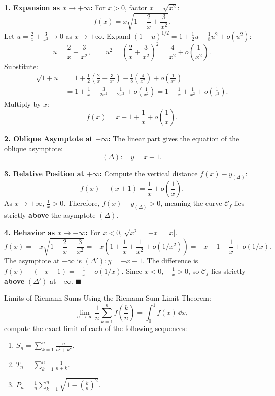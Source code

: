 \begin{solution}
\textbf{1. Expansion as $x \to +\infty$:}
For $x > 0$, factor $x = \sqrt{x^2}$:
\[
f(x) = x \sqrt{1 + \frac{2}{x} + \frac{3}{x^2}}.
\]
Let $u = \frac{2}{x} + \frac{3}{x^2} \to 0$ as $x \to +\infty$.
Expand $(1 + u)^{1/2} = 1 + \frac{1}{2}u - \frac{1}{8}u^2 + o(u^2)$:
\[
u = \frac{2}{x} + \frac{3}{x^2}, \qquad u^2 = \left(\frac{2}{x} + \frac{3}{x^2}\right)^2 = \frac{4}{x^2} + o\left(\frac{1}{x^2}\right).
\]
Substitute:
\begin{align*}
\sqrt{1 + u} &= 1 + \frac{1}{2}\left(\frac{2}{x} + \frac{3}{x^2}\right) - \frac{1}{8}\left(\frac{4}{x^2}\right) + o\left(\frac{1}{x^2}\right) \\
&= 1 + \frac{1}{x} + \frac{3}{2x^2} - \frac{1}{2x^2} + o\left(\frac{1}{x^2}\right) = 1 + \frac{1}{x} + \frac{1}{x^2} + o\left(\frac{1}{x^2}\right).
\end{align*}
Multiply by $x$:
\[
f(x) = x + 1 + \frac{1}{x} + o\left(\frac{1}{x}\right).
\]

\textbf{2. Oblique Asymptote at $+\infty$:}
The linear part gives the equation of the oblique asymptote:
\[
(\Delta): \quad y = x + 1.
\]

\textbf{3. Relative Position at $+\infty$:}
Compute the vertical distance $f(x) - y_{(\Delta)}$:
\[
f(x) - (x + 1) = \frac{1}{x} + o\left(\frac{1}{x}\right).
\]
As $x \to +\infty$, $\frac{1}{x} > 0$.
Therefore, $f(x) - y_{(\Delta)} > 0$, meaning the curve $\mathcal{C}_f$ lies strictly \textbf{above} the asymptote $(\Delta)$.

\textbf{4. Behavior as $x \to -\infty$:}
For $x < 0$, $\sqrt{x^2} = -x = |x|$.
\[
f(x) = -x \sqrt{1 + \frac{2}{x} + \frac{3}{x^2}} = -x \left(1 + \frac{1}{x} + \frac{1}{x^2} + o(1/x^2)\right) = -x - 1 - \frac{1}{x} + o(1/x).
\]
The asymptote at $-\infty$ is $(\Delta'): y = -x - 1$.
The difference is $f(x) - (-x - 1) = -\frac{1}{x} + o(1/x)$.
Since $x < 0$, $-\frac{1}{x} > 0$, so $\mathcal{C}_f$ lies strictly \textbf{above} $(\Delta')$ at $-\infty$. \hfill $\blacksquare$
\end{solution}

\begin{exercise}{Limits of Riemann Sums}
Using the Riemann Sum Limit Theorem:
\[
\lim_{n \to \infty} \frac{1}{n} \sum_{k=1}^n f\left(\frac{k}{n}\right) = \int_0^1 f(x)\,\dd x,
\]
compute the exact limit of each of the following sequences:
\begin{enumerate}[leftmargin=1.5em,itemsep=2pt]
  \item $S_n = \sum_{k=1}^n \frac{n}{n^2 + k^2}$.
  \item $T_n = \sum_{k=1}^n \frac{1}{n + k}$.
  \item $P_n = \frac{1}{n} \sum_{k=1}^n \sqrt{1 - \left(\frac{k}{n}\right)^2}$.
\end{enumerate}
\end{exercise}

